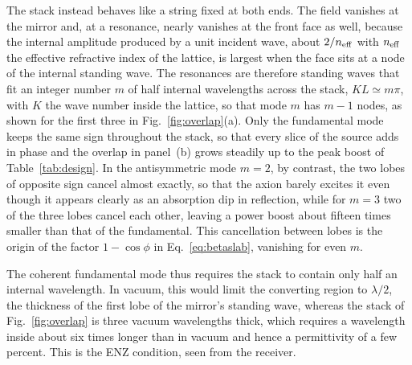 \documentclass[
  aps,prl,reprint,superscriptaddress,
  amsmath,amssymb,floatfix,nofootinbib
]{revtex4-2}
\begin{document}
The stack instead behaves like a string fixed at both ends. The field vanishes at the mirror and, at a resonance, nearly vanishes at the front face as well, because the internal amplitude produced by a unit incident wave, about $2/n_{\rm eff}$ with $n_{\rm eff}$ the effective refractive index of the lattice, is largest when the face sits at a node of the internal standing wave. The resonances are therefore standing waves that fit an integer number $m$ of half internal wavelengths across the stack, $KL\simeq m\pi$, with $K$ the wave number inside the lattice, so that mode $m$ has $m-1$ nodes, as shown for the first three in Fig.~\ref{fig:overlap}(a). Only the fundamental mode keeps the same sign throughout the stack, so that every slice of the source adds in phase and the overlap in panel~(b) grows steadily up to the peak boost of Table~\ref{tab:design}. In the antisymmetric mode $m=2$, by contrast, the two lobes of opposite sign cancel almost exactly, so that the axion barely excites it even though it appears clearly as an absorption dip in reflection, while for $m=3$ two of the three lobes cancel each other, leaving a power boost about fifteen times smaller than that of the fundamental. This cancellation between lobes is the origin of the factor $1-\cos\phi$ in Eq.~\eqref{eq:betaslab}, vanishing for even $m$.

The coherent fundamental mode thus requires the stack to contain only half an internal wavelength. In vacuum, this would limit the converting region to $\lambda/2$, the thickness of the first lobe of the mirror's standing wave, whereas the stack of Fig.~\ref{fig:overlap} is three vacuum wavelengths thick, which requires a wavelength inside about six times longer than in vacuum and hence a permittivity of a few percent. This is the ENZ condition, seen from the receiver.
\end{document}
